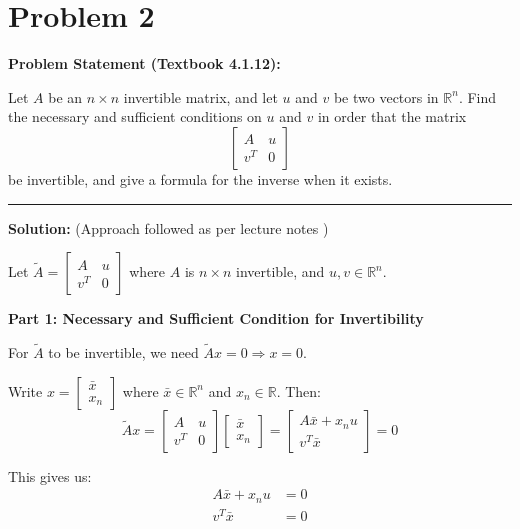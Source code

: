\clearpage
\section*{Problem 2}

\textbf{Problem Statement (Textbook 4.1.12):} 

Let $A$ be an $n \times n$ invertible matrix, and let $u$ and $v$ be two vectors in $\mathbb{R}^n$. Find the necessary and sufficient conditions on $u$ and $v$ in order that the matrix
$$\begin{bmatrix} A & u \\ v^T & 0 \end{bmatrix}$$
be invertible, and give a formula for the inverse when it exists.

\noindent\rule{\textwidth}{0.4pt}

\vspace{1em}

\textbf{Solution:} (Approach followed as per lecture notes \cite{panchenko_448_notes})

Let $\tilde{A} = \begin{bmatrix} A & u \\ v^T & 0 \end{bmatrix}$ where $A$ is $n \times n$ invertible, and $u, v \in \mathbb{R}^n$.

\textbf{Part 1: Necessary and Sufficient Condition for Invertibility}

For $\tilde{A}$ to be invertible, we need $\tilde{A}x = 0 \Rightarrow x = 0$.

Write $x = \begin{bmatrix} \bar{x} \\ x_n \end{bmatrix}$ where $\bar{x} \in \mathbb{R}^n$ and $x_n \in \mathbb{R}$. Then:
$$\tilde{A}x = \begin{bmatrix} A & u \\ v^T & 0 \end{bmatrix} \begin{bmatrix} \bar{x} \\ x_n \end{bmatrix} = \begin{bmatrix} A\bar{x} + x_n u \\ v^T\bar{x} \end{bmatrix} = 0$$

This gives us:
\begin{align}
A\bar{x} + x_n u &= 0 \tag{1}\\
v^T\bar{x} &= 0 \tag{2}
\end{align}

